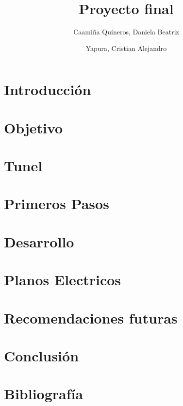 \documentclass[12pt,a4paper]{article}
\author{Caamiña Quineros, Daniela Beatriz\\ \and Yapura, Cristian Alejandro}
\title{Proyecto final}
\begin{document}
	\maketitle

	\newpage
	\tableofcontents
	\newpage
	\listoffigures
	\newpage


	\section{Introducción}
	

	\section{Objetivo}
	

	\section{Tunel}
		

	\section{Primeros Pasos}
	

	\section{Desarrollo}
	

	\section{Planos Electricos}
	
	
	\section{Recomendaciones futuras}
	

	\section{Conclusión}
	
	
	\section{Bibliografía}

\newpage
\end{document}
